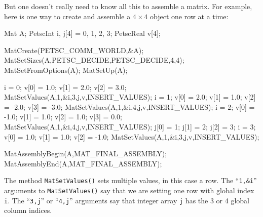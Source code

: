 But one doesn't really need to know all this to assemble a matrix.  For example, here is one way to create and assemble a $4\times 4$ \pMat object one row at a time:
\begin{code}
Mat A;
PetscInt  i, j[4] = {0, 1, 2, 3};
PetscReal v[4];

MatCreate(PETSC_COMM_WORLD,&A);
MatSetSizes(A,PETSC_DECIDE,PETSC_DECIDE,4,4);
MatSetFromOptions(A);
MatSetUp(A);

i = 0;  v[0] = 1.0;  v[1] = 2.0;  v[2] = 3.0;
MatSetValues(A,1,&i,3,j,v,INSERT_VALUES);
i = 1;  v[0] = 2.0;  v[1] = 1.0;  v[2] = -2.0;  v[3] = -3.0;
MatSetValues(A,1,&i,4,j,v,INSERT_VALUES);
i = 2;  v[0] = -1.0;  v[1] = 1.0;  v[2] = 1.0;  v[3] = 0.0;
MatSetValues(A,1,&i,4,j,v,INSERT_VALUES);
j[0] = 1;  j[1] = 2;  j[2] = 3;
i = 3;  v[0] = 1.0;  v[1] = 1.0;  v[2] = -1.0;
MatSetValues(A,1,&i,3,j,v,INSERT_VALUES);

MatAssemblyBegin(A,MAT_FINAL_ASSEMBLY);
MatAssemblyEnd(A,MAT_FINAL_ASSEMBLY);
\end{code}
The method \texttt{MatSetValues()} sets multiple values, in this case a row.  The ``\texttt{1,\&i}'' arguments to \texttt{MatSetValues()} say that we are setting one row with global index \texttt{i}.  The ``\texttt{3,j}'' or ``\texttt{4,j}'' arguments say that integer array \texttt{j} has the 3 or 4 global column indices.

